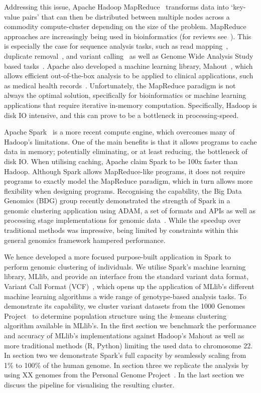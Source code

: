 \documentclass{bmcart}
\newcommand{\kMeans}{\textit{k}-means}
\begin{document}
Addressing this issue, {\sc Apache Hadoop MapReduce}~\cite{Borthakur2007} transforms data into `key-value pairs' that can then be distributed between multiple nodes across a commodity compute-cluster depending on the size of the problem. 
MapReduce approaches are increasingly being used in bioinformatics (for reviews see~\cite{Zou2013, Qiu2010,Taylor2010}). 
This is especially the case for sequence analysis tasks, such as read mapping~\cite{Schatz2009}, duplicate removal~\cite{Jourdren2012}, and variant calling~\cite{Langmead2009, McKenna2010} as well as Genome Wide Analysis Study based tasks~\cite{Huang2013, Guo2014}. 
Apache also developed a machine learning library, Mahout~\cite{Owen2011}, which allows efficient out-of-the-box analysis to be applied to clinical applications, such as medical health records~\cite{Ko2014}.
Unfortunately, the MapReduce paradigm is not always the optimal solution, specifically for bioinformatics or machine learning applications that require iterative in-memory computation. Specifically, Hadoop is disk IO intensive, and this can prove to be a bottleneck in processing-speed.

{\sc Apache Spark}~\cite{Zaharia2011} is a more recent compute engine, which overcomes many of Hadoop's limitations. 
One of the main benefits is that it allows programs to cache data in memory; potentially eliminating, or at least reducing, the bottleneck of disk IO. 
When utilising caching, Apache claim {\sc Spark} to be 100x faster than Hadoop. 
Although {\sc Spark} allows MapReduce-like programs, it does not require programs to exactly model the MapReduce paradigm, which in turn allows more flexibility when designing programs. 
Recognising the capability, the Big Data Genomics (BDG) group recently demonstrated the strength of {\sc Spark} in a genomic clustering application using ADAM, a set of formats and APIs as well as processing stage implementations for genomic data~\cite{Massie2013}. 
While the speedup over traditional methods was impressive, being limited by constraints within this general genomics framework hampered performance. 

We hence developed a more focused purpose-built application in {\sc Spark} to perform genomic clustering of individuals. 
We utilise {\sc Spark}'s machine learning library, \mbox{MLlib}, and provide an interface from the standard variant data format, Variant Call Format (VCF)~\cite{1KG2012}, which opens up the application of MLlib's different machine learning algorithms a wide range of genotype-based analysis tasks. 
To demonstrate its capability, we cluster variant datasets from the 1000 Genomes Project~\cite{1KG2012} to determine population structure using the \kMeans{} clustering algorithm available in MLlib's. 
In the first section we benchmark the performance and accuracy of MLlib's implementations against Hadoop's Mahout as well as more traditional methods (R, Python) limiting the used data to chromosome 22.
In section two we demonstrate {\sc Spark}'s full capacity by seamlessly scaling from 1\% to 100\% of the human genome.
In section three we replicate the analysis by using XX genomes from the Personal Genome Project~\cite{Lunshof2013}.
In the last section we discuss the pipeline for visualising the resulting cluster. 
\end{document}
